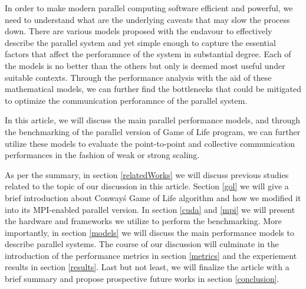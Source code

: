 
In order to make modern parallel computing software efficient and powerful, we need to understand what are the underlying caveats that may slow the process down. There are various models proposed with the endavour to effectively describe the parallel system and yet simple enough to capture the essential factors that affect the perforamnce of the system in substantial degree. Each of the models is no better than the others but only is deemed most useful under suitable contexts. Through the performance analysis with the aid of these mathematical models, we can further find the bottlenecks that could be mitigated to optimize the communication perforamnce of the parallel system. 

In this article, we will discuss the main parallel performance models, and through the benchmarking of the parallel version of Game of Life program, we can further utilize these models to evaluate the point-to-point and collective communication performances in the fashion of weak or strong scaling. 

As per the summary, in section \ref{relatedWorks} we will discuss previous studies related to the topic of our discussion in this article. Section \ref{gol} we will give a brief introduction about Conway\'s Game of Life algorithm and how we modified it into its MPI-enabled parallel version. In section \ref{cuda} and \ref{mpi} we will present the hardware and frameworks we utilize to perform the benchmarking. More importantly, in section \ref{models} we will discuss the main performance models to describe parallel systems. The course of our discussion will culminate in the introduction of the performance metrics in section \ref{metrics} and the experiement results in section \ref{results}. Last but not least, we will finalize the article with a brief summary and propose prospective future works in section \ref{conclusion}.

